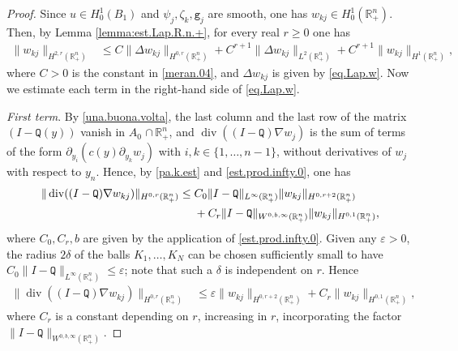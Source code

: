 \documentclass[10pt,reqno,a4paper]{article}
\numberwithin{equation}{section}
\theoremstyle{plain}
\theoremstyle{definition}
\newcommand{\R}{{\mathbb R}}
\newcommand{\e}{\varepsilon}
\newcommand{\pa}{\partial}
\newcommand{\grad}{\nabla}
\DeclareMathOperator{\divergence}{div}
\begin{document}
\begin{proof}
Since $u \in H^1_0(B_1)$ and $\psi_j, \zeta_k, \mathtt g_j$ are smooth, 
one has $w_{kj} \in H^1_0(\R^n_+)$. 
Then, by Lemma \ref{lemma:est.Lap.R.n.+}, for every real $r \geq 0$ one has 
\begin{align} 
\| w_{kj} \|_{H^{2,r}(\R^n_+)} 
& \leq C \| \Delta w_{kj} \|_{H^{0,r}(\R^n_+)} 
+ C^{r+1} \| \Delta w_{kj} \|_{L^2(\R^n_+)} 
+ C^{r+1} \| w_{kj} \|_{H^1(\R^n_+)}, 
\label{olive.01}
\end{align}
where $C > 0$ is the constant in \eqref{meran.04},
and $\Delta w_{kj}$ is given by \eqref{eq.Lap.w}. 
Now we estimate each term in the right-hand side of \eqref{eq.Lap.w}. 

\emph{First term}. 
By \eqref{una.buona.volta}, the last column and the last row 
of the matrix $(I - \mathtt Q(y))$ vanish in $A_0$ $\cap \, \R^n_+$,
and $\divergence ((I - \mathtt Q) \grad w_j)$ 
is the sum of terms of the form $\pa_{y_i} ( c(y) \pa_{y_k} w_j)$ 
with $i, k \in \{ 1, \ldots, n-1 \}$, without derivatives of $w_j$ with respect to $y_n$. 
Hence, by \eqref{pa.k.est} and \eqref{est.prod.infty.0}, one has 
\begin{align*}
\| \divergence ((I - \mathtt Q) \grad w_{kj}) \|_{H^{0,r}(\R^n_+)} 
& \leq C_0 \| I - \mathtt Q \|_{L^\infty(\R^n_+)} \| w_{kj} \|_{H^{0,r+2}(\R^n_+)}
\notag \\ & \quad \ 
+ C_r \| I - \mathtt Q \|_{W^{0,b,\infty}(\R^n_+)} \| w_{kj} \|_{H^{0,1}(\R^n_+)},
\end{align*}
where $C_0, C_r, b$ are given by the application of \eqref{est.prod.infty.0}. 
Given any $\e > 0$, the radius $2\delta$ of the balls $K_1, \ldots, K_N$ 
can be chosen sufficiently small to have 
$C_0 \| I - \mathtt Q \|_{L^\infty(\R^n_+)} \leq \e$; 
note that such a $\delta$ is independent on $r$. 
Hence 
\begin{align}  \label{olive.02}
\| \divergence ((I - \mathtt Q) \grad w_{kj}) \|_{H^{0,r}(\R^n_+)} 
& \leq \e \| w_{kj} \|_{H^{0,r+2}(\R^n_+)} 
+ C_r \| w_{kj} \|_{H^{0,1}(\R^n_+)},
\end{align} 
where $C_r$ is a constant depending on $r$, increasing in $r$, 
incorporating the factor $\| I - \mathtt Q \|_{W^{0,b,\infty}(\R^n_+)}$. 


\end{proof}
\end{document}
